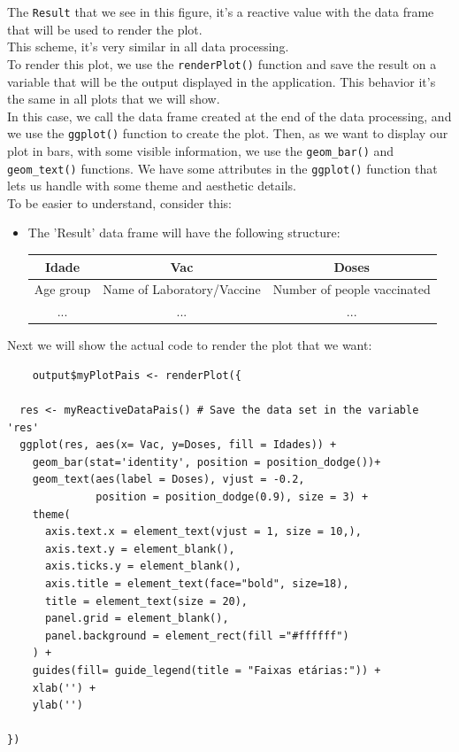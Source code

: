 The \verb!Result! that we see in this figure, it's a reactive value with the data frame that will be used to render the plot.\\ This scheme, it's very similar in all data processing.\\

To render this plot, we use the \texttt{renderPlot()} function and save the result on a variable that will be the output displayed in the application. This behavior it's the same in all plots that we will show.\\
In this case, we call the data frame created at the end of the data processing, and we use the \texttt{ggplot()} function to create the plot. Then, as we want to display our plot in bars, with some visible information, we use the \texttt{geom\_bar()} and \texttt{geom\_text()} functions. We have some attributes in the \texttt{ggplot()} function that lets us handle with some theme and aesthetic details.
\\ To be easier to understand, consider this:
\begin{itemize}
    \item The 'Result' data frame will have the following structure:
    \begin{center}
        \begin{tabular}{ |c|c|c| } 
             \hline
             \textbf{{Idade}} & \textbf{Vac} & \textbf{Doses} \\ \hline
             Age group & Name of Laboratory/Vaccine & Number of people vaccinated \\  
             ... & ... & ...\\
             \hline
        \end{tabular}
    \end{center}
\end{itemize} 

Next we will show the actual code to render the plot that we want:\\

\begin{verbatim}
    output$myPlotPais <- renderPlot({
  
  res <- myReactiveDataPais() # Save the data set in the variable 'res'
  ggplot(res, aes(x= Vac, y=Doses, fill = Idades)) + 
    geom_bar(stat='identity', position = position_dodge())+
    geom_text(aes(label = Doses), vjust = -0.2,
              position = position_dodge(0.9), size = 3) +
    theme(
      axis.text.x = element_text(vjust = 1, size = 10,),
      axis.text.y = element_blank(),
      axis.ticks.y = element_blank(),
      axis.title = element_text(face="bold", size=18),
      title = element_text(size = 20),
      panel.grid = element_blank(),
      panel.background = element_rect(fill ="#ffffff")
    ) + 
    guides(fill= guide_legend(title = "Faixas etárias:")) +
    xlab('') + 
    ylab('') 
  
})
\end{verbatim}

